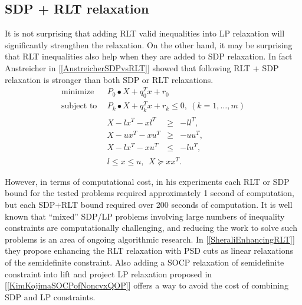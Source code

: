 \documentclass[12pt]{book}
\theoremstyle{definition}
\begin{document}
\subsection{SDP + RLT relaxation}
It is not surprising that adding RLT valid inequalities into LP relaxation will significantly strengthen the relaxation. 
On the other hand, it may be surprising that RLT inequalities also help when they are added to SDP relaxation. 
In fact Anstreicher in [\ref{AnstreicherSDPvsRLT}] showed that following RLT + SDP relaxation is stronger than both SDP or RLT relaxations.
 \begin{equation}
\label{SDP+RLTrelax1} 
\begin{array}{ll}
\mbox{minimize}&\ \ P_0\bullet X + q_0^Tx + r_0\\
\mbox{subject to}&\ \ P_k\bullet X+ q_k^Tx + r_k \leq 0, \  (k = 1,\dots ,m)\\
		& \begin{array}{lcl}
		 X - lx^T - xl^T & \geq & -ll^T, \\
		 X - ux^T - xu^T & \geq & -uu^T, \\
		 X - lx^T - xu^T & \leq & -lu^T, 
		 \end{array}\\
 		&\ \ l\leq x \leq u, \ \  X \succeq xx^T.
\end{array} 
\end{equation}

However, in terms of computational cost, in his experiments each RLT or SDP bound for the tested problems required approximately 1
second of computation, but each SDP+RLT bound required over 200 seconds of computation. It
is well known that “mixed” SDP/LP problems involving large numbers of inequality constraints
are computationally challenging, and reducing the work to solve such problems is an area of ongoing
algorithmic research. In [\ref{SheraliEnhancingRLT}] they propose enhancing the RLT relaxation with PSD cuts as linear relaxations of the semidefinite constraint. Also adding a SOCP relaxation of semidefinite constraint into lift and project LP relaxation proposed in [\ref{KimKojimaSOCPofNoncvxQOP}] offers a way to avoid the cost of combining SDP and LP constraints.
\end{document}
